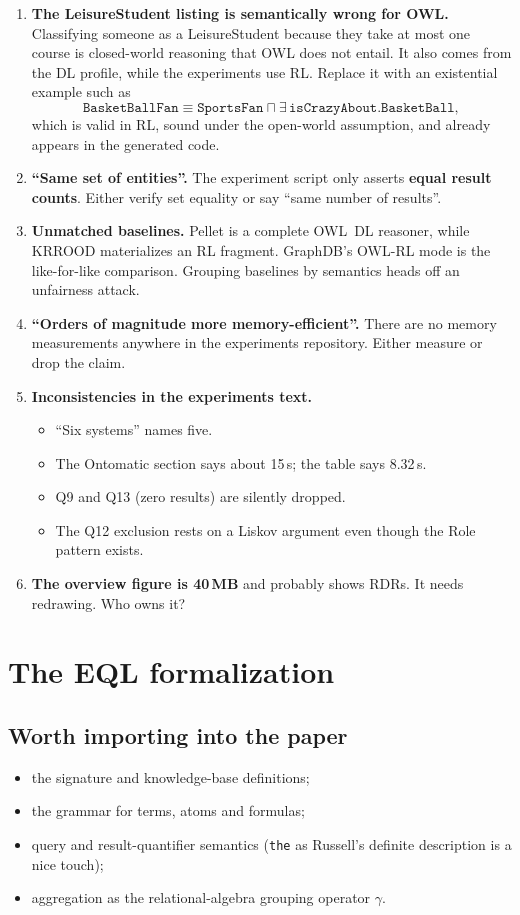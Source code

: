 \documentclass[11pt]{article}
\newcommand{\code}[1]{\texttt{#1}}
\begin{document}
\begin{enumerate}[label=\textbf{4.\arabic*}]
  \item \textbf{The LeisureStudent listing is semantically wrong for OWL.} Classifying someone as a LeisureStudent because they take at most one course is closed-world reasoning that OWL does not entail. It also comes from the DL profile, while the experiments use RL. Replace it with an existential example such as
  \[\code{BasketBallFan} \equiv \code{SportsFan} \sqcap \exists\,\code{isCrazyAbout}.\code{BasketBall},\]
  which is valid in RL, sound under the open-world assumption, and already appears in the generated code.
  \item \textbf{``Same set of entities''.} The experiment script only asserts \textbf{equal result counts}. Either verify set equality or say ``same number of results''.
  \item \textbf{Unmatched baselines.} Pellet is a complete OWL~DL reasoner, while KRROOD materializes an RL fragment. GraphDB's OWL-RL mode is the like-for-like comparison. Grouping baselines by semantics heads off an unfairness attack.
  \item \textbf{``Orders of magnitude more memory-efficient''.} There are no memory measurements anywhere in the experiments repository. Either measure or drop the claim.
  \item \textbf{Inconsistencies in the experiments text.}
  \begin{itemize}
    \item ``Six systems'' names five.
    \item The Ontomatic section says about 15\,s; the table says 8.32\,s.
    \item Q9 and Q13 (zero results) are silently dropped.
    \item The Q12 exclusion rests on a Liskov argument even though the Role pattern exists.
  \end{itemize}
  \item \textbf{The overview figure is 40\,MB} and probably shows RDRs. It needs redrawing. Who owns it?
\end{enumerate}

\section{The EQL formalization}

\subsection{Worth importing into the paper}
\begin{itemize}
  \item the signature and knowledge-base definitions;
  \item the grammar for terms, atoms and formulas;
  \item query and result-quantifier semantics (\code{the} as Russell's definite description is a nice touch);
  \item aggregation as the relational-algebra grouping operator $\gamma$.
\end{itemize}
\end{document}
